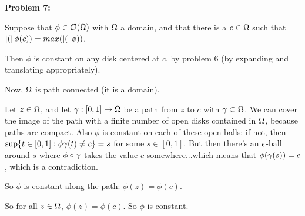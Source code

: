 \documentclass[a4paper,12pt]{article}
\begin{document}
\shunt

{\bf Problem 7:}

Suppose that $\phi \in \mathcal{O}(\Omega)$ with $\Omega$ a domain, and that there is a $c \in \Omega$ such that $\left\lvert ( \right\rvert\phi(c)) = max(\left\lvert ( \right\rvert\phi))$.

Then $\phi$ is constant on any disk centered at $c$, by problem 6 (by expanding and translating appropriately).

Now, $\Omega$ is path connected (it is a domain).

Let $z \in \Omega$, and let $\gamma: [0,1] \to \Omega$ be a path from $z$ to $c$ with $\gamma \subset \Omega$. We can cover the image of the path with a finite number of open disks contained in $\Omega$, because paths are compact. Also $\phi$ is constant on each of these open balls: if not, then $\sup\{t \in [0,1]: \phi\gamma(t) \neq c\} = s$ for some $s \in [0,1]$. But then there's an $\epsilon$-ball around $s$ where $\phi\circ\gamma$ takes the value $c$ somewhere...which means that $\phi(\gamma(s)) = c$, which is a contradiction. 

So $\phi$ is constant along the path: $\phi(z) = \phi(c)$.

So for all $z \in \Omega$, $\phi(z) = \phi(c)$. So $\phi$ is constant.

\shunt
\end{document}
